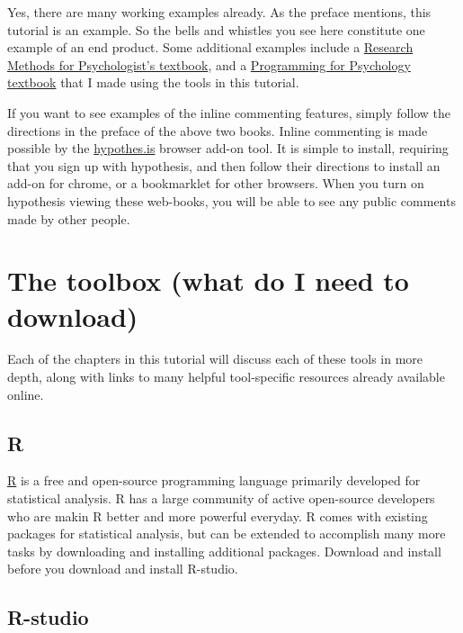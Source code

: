 \documentclass[
]{book}
\begin{document}
Yes, there are many working examples already. As the preface mentions, this tutorial is an example. So the bells and whistles you see here constitute one example of an end product. Some additional examples include a \href{https://crumplab.github.io/ResearchMethods/}{Research Methods for Psychologist's textbook}, and a \href{https://crumplab.github.io/programmingforpsych/}{Programming for Psychology textbook} that I made using the tools in this tutorial.

If you want to see examples of the inline commenting features, simply follow the directions in the preface of the above two books. Inline commenting is made possible by the \href{https://web.hypothes.is}{hypothes.is} browser add-on tool. It is simple to install, requiring that you sign up with hypothesis, and then follow their directions to install an add-on for chrome, or a bookmarklet for other browsers. When you turn on hypothesis viewing these web-books, you will be able to see any public comments made by other people.

\hypertarget{the-toolbox-what-do-i-need-to-download}{%
\section{The toolbox (what do I need to download)}\label{the-toolbox-what-do-i-need-to-download}}

Each of the chapters in this tutorial will discuss each of these tools in more depth, along with links to many helpful tool-specific resources already available online.

\hypertarget{r}{%
\subsection{R}\label{r}}

\href{https://www.r-project.org}{R} is a free and open-source programming language primarily developed for statistical analysis. R has a large community of active open-source developers who are makin R better and more powerful everyday. R comes with existing packages for statistical analysis, but can be extended to accomplish many more tasks by downloading and installing additional packages. Download and install before you download and install R-studio.

\hypertarget{r-studio}{%
\subsection{R-studio}\label{r-studio}}
\end{document}
